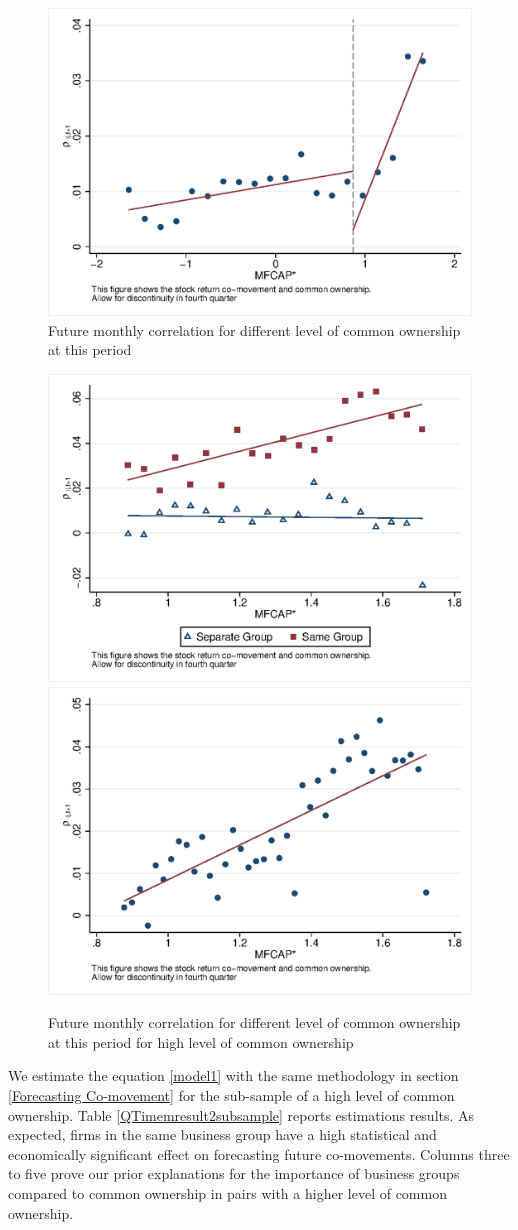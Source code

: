 			\begin{figure}[htbp]
				\centering  
				\includegraphics[width=0.6\linewidth]{"Output/Qmcorr5lrd.eps"}
				\caption{Future monthly correlation for different level of common ownership at this period}
				\label{Qmcorr5lrd}
			\end{figure}
			\begin{figure}[htbp]
				\centering  
				\includegraphics[width=0.45\linewidth]{"Output/Qmcorr5lrdbgsubsample.eps"}
				\includegraphics[width=0.45\linewidth]{"Output/Qmcorr5subsample.eps"}
				\caption{Future monthly correlation for different level of common ownership at this period for high level of common ownership}
				\label{Qmcorr5subsample}
			\end{figure}
			
			
			We estimate the equation \ref{model1} with the same methodology in section \ref{Forecasting Co-movement}  for the sub-sample of a high level of common ownership. Table \ref{QTimemresult2subsample} reports estimations results. As expected, firms in the same business group have a high statistical and economically significant effect on forecasting future co-movements. Columns three to five prove our prior explanations for the importance of business groups compared to common ownership in pairs with a higher level of common ownership. 
			

